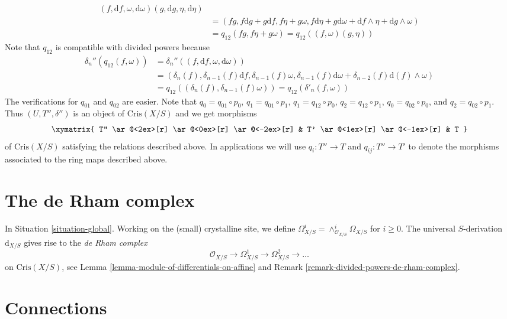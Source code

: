 \begin{remark}
\begin{align*}
(f, \text{d}f, \omega, \text{d}\omega)(g, \text{d}g, \eta, \text{d}\eta) \\
& =
(fg, f\text{d}g + g \text{d}f, f\eta + g\omega,
f\text{d}\eta + g\text{d}\omega + \text{d}f \wedge \eta +
\text{d}g \wedge \omega) \\
& = q_{12}(fg, f\eta + g\omega) = q_{12}((f, \omega)(g, \eta))
\end{align*}
Note that $q_{12}$ is compatible with divided powers because
\begin{align*}
\delta_n''(q_{12}(f, \omega)) & =
\delta_n''((f, \text{d}f, \omega, \text{d}\omega)) \\
& =
(\delta_n(f), \delta_{n - 1}(f)\text{d}f, \delta_{n - 1}(f)\omega,
\delta_{n - 1}(f)\text{d}\omega + \delta_{n - 2}(f)\text{d}(f) \wedge \omega)
\\
& = q_{12}((\delta_n(f), \delta_{n - 1}(f)\omega)) =
q_{12}(\delta'_n(f, \omega))
\end{align*}
The verifications for $q_{01}$ and $q_{02}$ are easier.
Note that $q_0 = q_{01} \circ p_0$, $q_1 = q_{01} \circ p_1$,
$q_1 = q_{12} \circ p_0$, $q_2 = q_{12} \circ p_1$,
$q_0 = q_{02} \circ p_0$, and $q_2 = q_{02} \circ p_1$.
Thus $(U, T'', \delta'')$ is an object of $\text{Cris}(X/S)$
and we get morphisms
$$
\xymatrix{
T''
\ar@<2ex>[r]
\ar@<0ex>[r]
\ar@<-2ex>[r]
&
T'
\ar@<1ex>[r]
\ar@<-1ex>[r]
&
T
}
$$
of $\text{Cris}(X/S)$ satisfying the relations described above.
In applications we will use $q_i : T'' \to T$ and
$q_{ij} : T'' \to T'$ to denote the morphisms associated to the
ring maps described above.
\end{remark}






\section{The de Rham complex}
\label{section-de-Rham}

\noindent
In Situation \ref{situation-global}.
Working on the (small) crystalline site, we define
$\Omega^i_{X/S} = \wedge^i_{\mathcal{O}_{X/S}} \Omega_{X/S}$
for $i \geq 0$. The universal $S$-derivation $\text{d}_{X/S}$ gives
rise to the {\it de Rham complex}
$$
\mathcal{O}_{X/S} \to \Omega^1_{X/S} \to \Omega^2_{X/S} \to \ldots
$$
on $\text{Cris}(X/S)$, see
Lemma \ref{lemma-module-of-differentials-on-affine} and
Remark \ref{remark-divided-powers-de-rham-complex}.


\section{Connections}
\label{section-connections}

